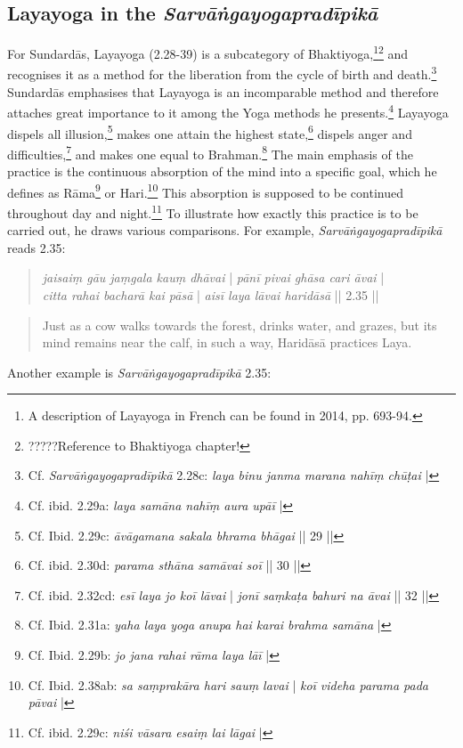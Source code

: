 \subsection{Layayoga in the \textit{Sarvāṅgayogapradīpikā}}
\label{layaintrosarvanga}
For Sundardās, Layayoga (2.28-39) is a subcategory of Bhaktiyoga,\footnote{A description of Layayoga in French can be found in \citeauthor{burger2014sarvangayogapradipika} 2014, pp. 693-94.}\footnote{?????Reference to Bhaktiyoga chapter!} and recognises it as a method for the liberation from the cycle of birth and death.\footnote{Cf. \textit{Sarvāṅgayogapradīpikā} 2.28c: \textit{laya binu janma marana nahīṃ chūṭai} |} Sundardās emphasises that Layayoga is an incomparable method and therefore attaches great importance to it among the Yoga methods he presents.\footnote{Cf. ibid. 2.29a: \textit{laya samāna nahīṃ aura upāī} |} Layayoga dispels all illusion,\footnote{Cf. Ibid. 2.29c: \textit{āvāgamana sakala bhrama bhāgai} || 29 ||} makes one attain the highest state,\footnote{Cf. ibid. 2.30d: \textit{parama sthāna samāvai soī} || 30 ||} dispels anger and difficulties,\footnote{Cf. ibid. 2.32cd: \textit{esī laya jo koī lāvai} | \textit{jonī saṃkaṭa bahuri na āvai} || 32 ||} and makes one equal to Brahman.\footnote{Cf. Ibid. 2.31a: \textit{yaha laya yoga anupa hai karai brahma samāna} |} The main emphasis of the practice is the continuous absorption of the mind into a specific goal, which he defines as Rāma\footnote{Cf. Ibid. 2.29b: \textit{jo jana rahai rāma laya lāī} |} or Hari.\footnote{Cf. Ibid. 2.38ab: \textit{sa saṃprakāra hari sauṃ lavai} | \textit{koī videha parama pada pāvai} |} This absorption is supposed to be continued throughout day and night.\footnote{Cf. ibid. 2.29c: \textit{niśi vāsara esaiṃ lai lāgai} |} To illustrate how exactly this practice is to be carried out, he draws various comparisons. For example, \textit{Sarvāṅgayogapradīpikā} reads 2.35: 

\begin{quote}
\textit{jaisaiṃ gāu jaṃgala kauṃ dhāvai} | \textit{pānī pivai ghāsa cari āvai} |\\ 
\textit{citta rahai bacharā kai pāsā} | \textit{aisī laya lāvai haridāsā} || 2.35 ||
\end{quote}
\begin{quote}
  Just as a cow walks towards the forest, drinks water, and grazes, but its mind remains near the calf, in such a way, Haridāsā practices Laya.
\end{quote}

Another example is \textit{Sarvāṅgayogapradīpikā} 2.35:

